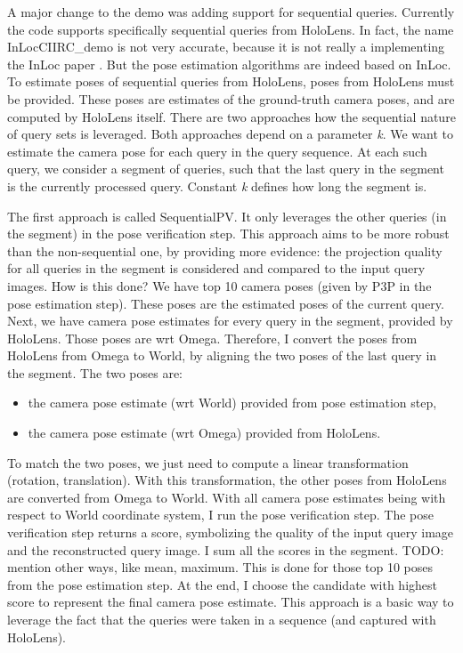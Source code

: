 \documentclass[twoside]{ctuthesis}
\theoremstyle{plain}
\theoremstyle{definition}
\theoremstyle{note}
\newcommand{\topPE}{10} %
\begin{document}
A major change to the demo was adding support for sequential queries. Currently the code supports specifically sequential queries from HoloLens. In fact, the name InLocCIIRC\_demo is not very accurate, because it is not really a implementing the InLoc paper \cite{taira2018inloc}. But the pose estimation algorithms are indeed based on InLoc. To estimate poses of sequential queries from HoloLens, poses from HoloLens must be provided. These poses are estimates of the ground-truth camera poses, and are computed by HoloLens itself. There are two approaches how the sequential nature of query sets is leveraged. Both approaches depend on a parameter \emph{k}. We want to estimate the camera pose for each query in the query sequence. At each such query, we consider a segment of queries, such that the last query in the segment is the currently processed query. Constant \emph{k} defines how long the segment is.

The first approach is called SequentialPV. It only leverages the other queries (in the segment) in the pose verification step. This approach aims to be more robust than the non-sequential one, by providing more evidence: the projection quality for all queries in the segment is considered and compared to the input query images. How is this done? We have top \topPE{} camera poses (given by P3P in the pose estimation step). These poses are the estimated poses of the current query. Next, we have camera pose estimates for every query in the segment, provided by HoloLens. Those poses are wrt Omega. Therefore, I convert the poses from HoloLens from Omega to World, by aligning the two poses of the last query in the segment. The two poses are:

\begin{itemize}
	\item the camera pose estimate (wrt World) provided from pose estimation step,
	\item the camera pose estimate (wrt Omega) provided from HoloLens.
\end{itemize}

To match the two poses, we just need to compute a linear transformation (rotation, translation). With this transformation, the other poses from HoloLens are converted from Omega to World. With all camera pose estimates being with respect to World coordinate system, I run the pose verification step. The pose verification step returns a score, symbolizing the quality of the input query image and the reconstructed query image. I sum all the scores in the segment. TODO: mention other ways, like mean, maximum. This is done for those top \topPE{} poses from the pose estimation step. At the end, I choose the candidate with highest score to represent the final camera pose estimate. This approach is a basic way to leverage the fact that the queries were taken in a sequence (and captured with HoloLens).
\end{document}
